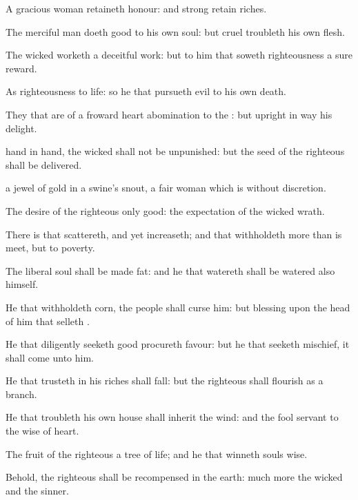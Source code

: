 {A
gracious
woman
retaineth
honour: and
strong
{}
retain
riches.

The
merciful
man doeth
good to his own
soul: but
{}
cruel
troubleth his own
flesh.

The
wicked
worketh a
deceitful
work: but to him that
soweth
righteousness
{} a
sure
reward.

As
righteousness
{} to
life: so he that
pursueth
evil
{} to his own
death.

They that are of a
froward
heart
{}
abomination to the
{}: but
{}
upright in
{}
way
{} his
delight.

hand
{} in
hand, the
wicked shall not be
unpunished: but the
seed of the
righteous shall be
delivered.

 a
jewel of
gold in a
swine’s
snout,
{} a
fair
woman which is
without
discretion.

The
desire of the
righteous
{} only
good:
{} the
expectation of the
wicked
{}
wrath.

There
is that
scattereth, and yet
increaseth; and
{} that
withholdeth more than is
meet, but
{} to
poverty.

The
liberal
soul shall be made
fat: and he that
watereth shall be
watered also himself.

He that
withholdeth
corn, the
people shall
curse him: but
blessing
{} upon the
head of him that
selleth
{}.

He that diligently
seeketh
good
procureth
favour: but he that
seeketh
mischief, it shall
come unto him.

He that
trusteth in his
riches shall
fall: but the
righteous shall
flourish as a
branch.

He that
troubleth his own
house shall
inherit the
wind: and the
fool
{}
servant to the
wise of
heart.

The
fruit of the
righteous
{} a
tree of
life; and he that
winneth
souls
{}
wise.

Behold, the
righteous shall be
recompensed in the
earth: much more the
wicked and the
sinner.




}
